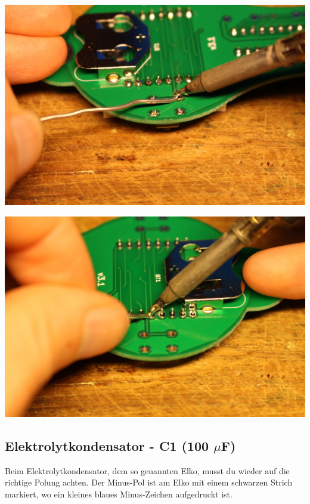 \documentclass{article}
\begin{document}
\begin{minipage}[b]{0.5\textwidth}
	\includegraphics[width=\textwidth]{Bilder2021/IMG_8159.JPG}
\end{minipage}
\begin{minipage}[b]{0.5\textwidth}
	\includegraphics[width=\textwidth]{Bilder2021/IMG_8156.JPG}
\end{minipage}

\subsection{Elektrolytkondensator - C1 (100 $\mu$F)}

Beim Elektrolytkondensator, dem so genannten Elko, musst du wieder auf die richtige Polung achten. Der Minus-Pol ist am Elko mit einem schwarzen Strich markiert, wo ein kleines blaues Minus-Zeichen aufgedruckt ist.
\end{document}
